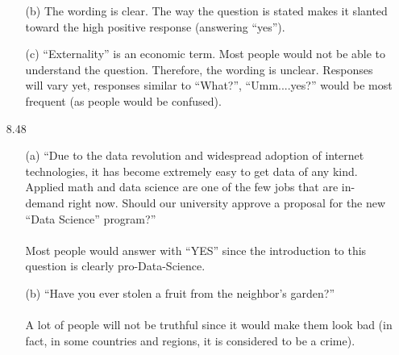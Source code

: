 \documentclass[11pt, a4paper]{article}
\begin{document}
\begin{itemize}
\begin{itemize}
\item[(b)]
The wording is clear. The way the question is stated makes it slanted toward the high
positive response (answering ``yes'').

\item[]

\item[(c)]
``Externality'' is an economic term. Most people would not be able to understand the question.
Therefore, the wording is unclear. Responses will vary yet, responses similar to ``What?'', ``Umm....yes?''
would be most frequent (as people would be confused).
\end{itemize}

\item[]
\item[]

\item[8.48]
\begin{itemize}
\item[(a)]
``Due to the data revolution and widespread adoption of internet technologies,
it has become extremely easy to get data of any kind. Applied math and data
science are one of the few jobs that are in-demand right now. Should our university
approve a proposal for the new ``Data Science'' program?''\\\\
Most people would answer with ``YES'' since the introduction to this question
is clearly pro-Data-Science.

\item[]

\item[(b)]
``Have you ever stolen a fruit from the neighbor's garden?''\\\\
A lot of people will not be truthful since it would make them
look bad (in fact, in some countries and regions, it is considered to be a crime).
\end{itemize}

\end{itemize}
\end{document}
